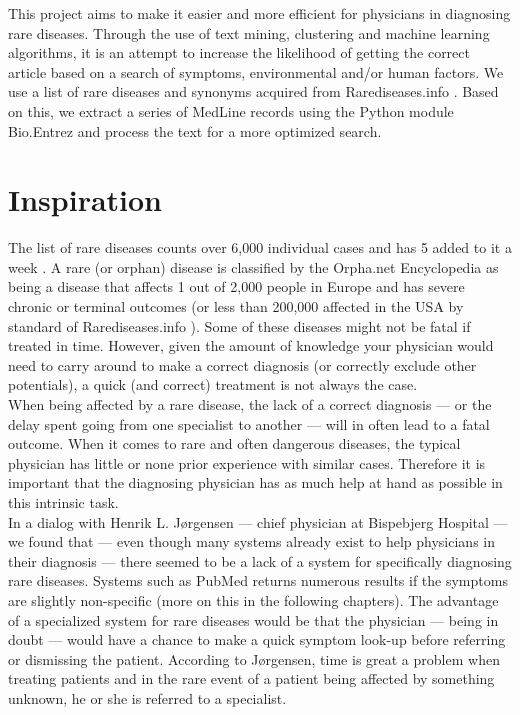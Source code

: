 This project aims to make it easier and more efficient for physicians
in diagnosing rare diseases. Through the use of text mining,
clustering and machine learning algorithms, it is an attempt to
increase the likelihood of getting the correct article based on a
search of symptoms, environmental and/or human factors. We use a list
of rare diseases and synonyms acquired from Rarediseases.info
\cite{Rarediseases}. Based on this, we
extract a series of MedLine records \cite{PubMedFactSheetMedline}
using the Python module Bio.Entrez \cite{EntrezProgUtil} and process
the text for a more optimized search.

\section{Inspiration}

The list of rare diseases counts over 6,000 individual cases and has 5
added to it a week \cite{AboutRareDiseasesOrphanet}. A rare (or
orphan) disease is classified by the Orpha.net Encyclopedia
\cite{OrphanetEncyclopedia} as being a disease that affects 1 out of
2,000 people in Europe and has severe chronic or terminal outcomes (or
less than 200,000 affected in the USA by standard of Rarediseases.info
\cite{Rarediseases}). Some of these  diseases might not be fatal if
treated in time. However, given the amount of knowledge your physician
would need to carry around to make a correct diagnosis (or correctly
exclude other potentials), a quick (and correct) treatment is not
always the case.\\

When being affected by a rare disease, the lack of a correct diagnosis
--- or the delay spent going from one specialist to another --- will in
often lead to a fatal outcome. When it comes to rare and often
dangerous diseases, the typical physician has little or none prior
experience with similar cases. Therefore it is important that the
diagnosing physician has as much help at hand as possible in this
intrinsic task.\\

In a dialog with Henrik L. J\o rgensen \cite{TheDude} --- chief
physician at Bispebjerg Hospital --- we found that --- even though many
systems already exist to help physicians in their diagnosis --- there
seemed to be a lack of a system for specifically diagnosing rare
diseases. Systems such as PubMed returns numerous results if the
symptoms are slightly non-specific (more on this in the following
chapters). The advantage of a specialized system for rare diseases
would be that the physician --- being in doubt --- would have a chance
to make a quick symptom look-up before referring or dismissing the
patient. According to Jørgensen, time is great a problem when treating
patients and in the rare event of a patient being affected by
something unknown, he or she is referred to a specialist.\\

